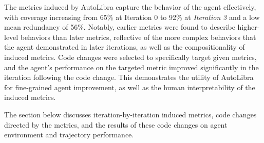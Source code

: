 The metrics induced by AutoLibra capture the behavior of the agent effectively, with
coverage increasing from 65\% at Iteration 0 to 92\% at \emph{Iteration 3} and a
low mean redundancy of 56\%. Notably, earlier metrics were found to describe higher-level
behaviors than later metrics, reflective of the more complex behaviors that the
agent demonstrated in later iterations, as well as the compositionality of induced
metrics. Code changes were selected to specifically target given metrics, and the
agent's performance on the targeted metric improved significantly in the iteration
following the code change. This demonstrates the utility of AutoLibra for fine-grained
agent improvement, as well as the human interpretability of the induced metrics.

The section below discusses iteration-by-iteration induced metrics, code changes
directed by the metrics, and the results of these code changes on agent environment
and trajectory performance.

